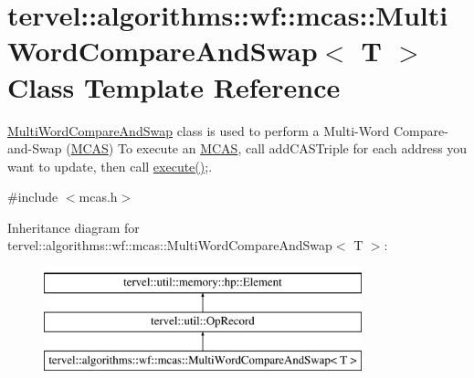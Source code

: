 \hypertarget{classtervel_1_1algorithms_1_1wf_1_1mcas_1_1_multi_word_compare_and_swap}{}\section{tervel\+:\+:algorithms\+:\+:wf\+:\+:mcas\+:\+:Multi\+Word\+Compare\+And\+Swap$<$ T $>$ Class Template Reference}
\label{classtervel_1_1algorithms_1_1wf_1_1mcas_1_1_multi_word_compare_and_swap}


\hyperlink{classtervel_1_1algorithms_1_1wf_1_1mcas_1_1_multi_word_compare_and_swap}{Multi\+Word\+Compare\+And\+Swap} class is used to perform a Multi-\/\+Word Compare-\/and-\/\+Swap (\hyperlink{classtervel_1_1algorithms_1_1wf_1_1mcas_1_1_m_c_a_s}{M\+C\+A\+S}) To execute an \hyperlink{classtervel_1_1algorithms_1_1wf_1_1mcas_1_1_m_c_a_s}{M\+C\+A\+S}, call add\+C\+A\+S\+Triple for each address you want to update, then call \hyperlink{classtervel_1_1algorithms_1_1wf_1_1mcas_1_1_multi_word_compare_and_swap_a3cf56f32c7579f734b1e0ecbd8d9c7f3}{execute()};.  




{\ttfamily \#include $<$mcas.\+h$>$}

Inheritance diagram for tervel\+:\+:algorithms\+:\+:wf\+:\+:mcas\+:\+:Multi\+Word\+Compare\+And\+Swap$<$ T $>$\+:\begin{figure}[H]
\begin{center}
\leavevmode
\includegraphics[height=3.000000cm]{classtervel_1_1algorithms_1_1wf_1_1mcas_1_1_multi_word_compare_and_swap}
\end{center}
\end{figure}
